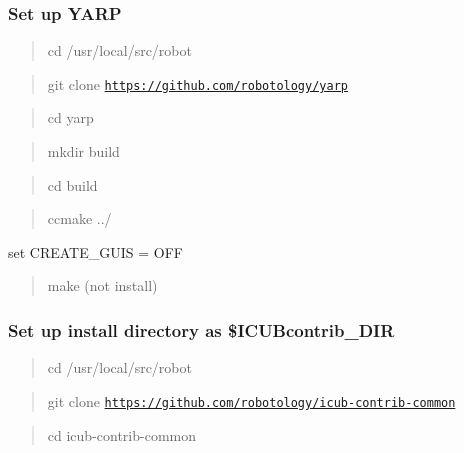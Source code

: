 \subsubsection*{Set up Y\+A\+RP}

\begin{quote}
cd /usr/local/src/robot \end{quote}


\begin{quote}
git clone \href{https://github.com/robotology/yarp}{\tt https\+://github.\+com/robotology/yarp} \end{quote}


\begin{quote}
cd yarp \end{quote}


\begin{quote}
mkdir build \end{quote}


\begin{quote}
cd build \end{quote}


\begin{quote}
ccmake ../ \end{quote}



\begin{DoxyItemize}
\item set C\+R\+E\+A\+T\+E\+\_\+\+G\+U\+IS = O\+FF
\end{DoxyItemize}

\begin{quote}
make (not install) \end{quote}


\subsubsection*{Set up install directory as \$\+I\+C\+U\+Bcontrib\+\_\+\+D\+IR}

\begin{quote}
cd /usr/local/src/robot \end{quote}


\begin{quote}
git clone \href{https://github.com/robotology/icub-contrib-common}{\tt https\+://github.\+com/robotology/icub-\/contrib-\/common} \end{quote}


\begin{quote}
cd icub-\/contrib-\/common \end{quote}


